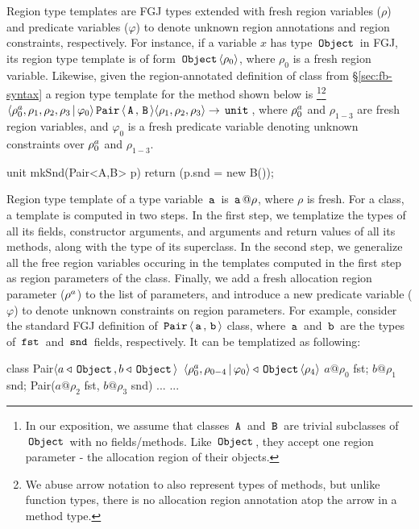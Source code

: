 Region type templates are FGJ types extended with fresh region
variables ($\rho$) and predicate variables ($\varphi$) to denote
unknown region annotations and region constraints, respectively. For
instance, if a variable $x$ has type $\,{\tt Object}\,$ in FGJ, its region type
template is of form $\,{\tt Object}\,\langle \rho_0 \rangle$, where $\rho_0$ is a fresh
region variable. Likewise, given the region-annotated definition of
 class from \S\ref{sec:fb-syntax} a region type template for
the method  shown below is \footnote{In our
exposition, we assume that classes $\,{\tt A}\,$ and $\,{\tt B}\,$ are trivial
subclasses of $\,{\tt Object}\,$ with no fields/methods. Like $\,{\tt Object}\,$, they
accept one region parameter - the allocation region of their
objects.}\footnote{We abuse arrow notation to also represent types of
methods, but unlike function types, there is no allocation region
annotation atop the arrow in a method type.}
$\langle \rho^a_0,\rho_1,\rho_2,\rho_3 \,|\, \varphi_0 \rangle
\,{\tt Pair}\,\langle \,{\tt A}\,,\,{\tt B}\, \rangle \langle \rho_1,\rho_2,\rho_3 \rangle \rightarrow
\,{\tt unit}\,$, where $\rho^a_0$ and $\rho_{1-3}$ are fresh region
variables, and $\varphi_0$ is a fresh predicate variable denoting
unknown constraints over $\rho^a_0$ and $\rho_{1-3}$.  
\begin{codejava}
  unit mkSnd(Pair<A,B> p) {
    return (p.snd = new B());
  }
\end{codejava}
Region type template of a type variable $\,{\tt a}\,$ is $\,{\tt a}\,@\rho$, where
$\rho$ is fresh. For a class, a template is computed in two steps. In
the first step, we templatize the types of all its fields, constructor
arguments, and arguments and return values of all its methods, along
with the type of its superclass. In the second step, we generalize all
the free region variables occuring in the templates computed in the
first step as region parameters of the class. Finally, we add a fresh
allocation region parameter ($\rho^a$) to the list of parameters,
and introduce a new predicate variable ($\varphi$) to denote unknown
constraints on region parameters. For example, consider the standard
FGJ definition of $\,{\tt Pair}\,\langle \,{\tt a}\,,\,{\tt b}\, \rangle$ class, where $\,{\tt a}\,$
and $\,{\tt b}\,$ are the types of $\,{\tt fst}\,$ and $\,{\tt snd}\,$ fields,
respectively. It can be templatized as following:
\begin{center}
\begin{codejava}
class Pair$\langle a\triangleleft\,{\tt Object}\,, b\triangleleft\,{\tt Object}\, \rangle$
          $\langle \rho^a_0,\rho_{0-4}\,|\,\varphi_0 \rangle \triangleleft \,{\tt Object}\,\langle \rho_4 \rangle$ {
  $a@\rho_0$ fst;
  $b@\rho_1$ snd;
  Pair($a@\rho_2$ fst, $b@\rho_3$ snd) { $...$ }
  $...$
}
\end{codejava}
\end{center}
